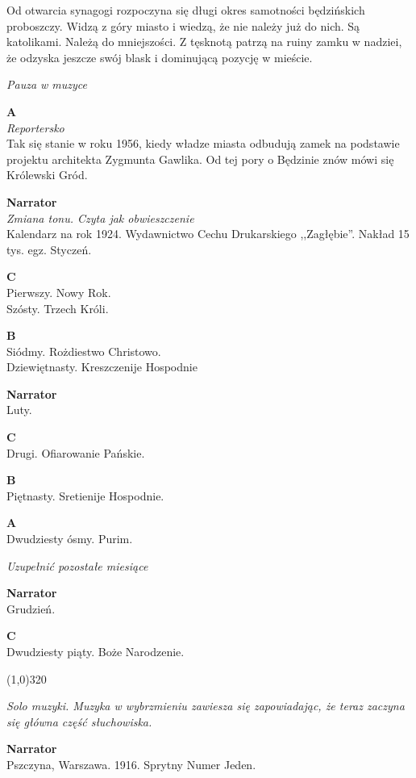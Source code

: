 \documentclass[11pt,a4paper,oneside]{article}
\begin{document}
Od otwarcia synagogi rozpoczyna się długi okres samotności będzińskich
proboszczy. Widzą z góry miasto i wiedzą, że nie należy już do nich.
Są katolikami. Należą do mniejszości. Z tęsknotą patrzą na ruiny zamku w nadziei,
że odzyska jeszcze swój blask i dominującą pozycję w mieście. 

{\color{light-gray} \emph{Pauza w muzyce}}

\textbf{A}\\
{\color{light-gray} \emph{Reportersko}}\\
Tak się stanie w roku 1956, kiedy władze miasta odbudują zamek na podstawie
projektu architekta Zygmunta Gawlika. Od tej pory o Będzinie znów mówi się
Królewski Gród.

\textbf{Narrator}\\
{\color{light-gray} \emph{Zmiana tonu. Czyta jak obwieszczenie}}\\
Kalendarz na rok 1924. Wydawnictwo Cechu Drukarskiego
,,Zagłębie''. Nakład 15 tys. egz. Styczeń.

\textbf{C}\\
Pierwszy. Nowy Rok. \\
Szósty. Trzech Króli.

\textbf{B}\\
Siódmy. Rożdiestwo Christowo. \\
Dziewiętnasty. Kreszczenije Hospodnie

\textbf{Narrator}\\
Luty.

\textbf{C}\\
Drugi. Ofiarowanie Pańskie.

\textbf{B}\\
Piętnasty. Sretienije Hospodnie.

\textbf{A}\\
Dwudziesty ósmy. Purim.

{\color{red} \emph{Uzupełnić pozostałe miesiące}}

\textbf{Narrator}\\
Grudzień.

\textbf{C}\\
Dwudziesty piąty. Boże Narodzenie.

\line(1,0){320}

{\color{light-gray} \emph{Solo muzyki. Muzyka w wybrzmieniu zawiesza się
zapowiadając, że teraz zaczyna się główna część słuchowiska.}}

\textbf{Narrator}\\
Pszczyna, Warszawa. 1916. Sprytny Numer Jeden. 
\end{document}
